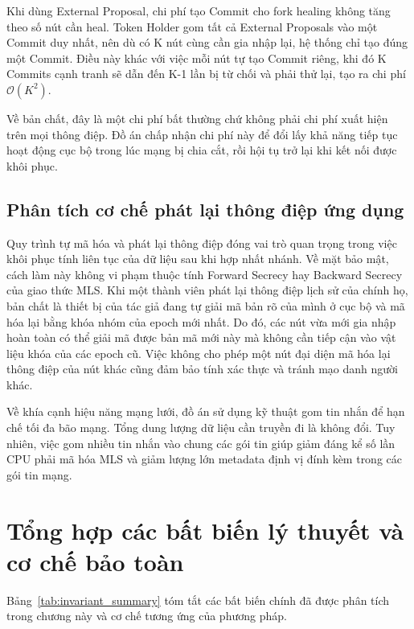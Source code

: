 \documentclass[../DoAn.tex]{subfiles}
\begin{document}
Khi dùng External Proposal, chi phí tạo Commit cho fork healing không tăng theo số nút cần heal. Token Holder gom tất cả External Proposals vào một Commit duy nhất, nên dù có K nút cùng cần gia nhập lại, hệ thống chỉ tạo đúng một Commit. Điều này khác với việc mỗi nút tự tạo Commit riêng, khi đó K Commits cạnh tranh sẽ dẫn đến K-1 lần bị từ chối và phải thử lại, tạo ra chi phí $\mathcal{O}(K^2)$.

Về bản chất, đây là một chi phí bất thường chứ không phải chi phí xuất hiện trên mọi thông điệp. Đồ án chấp nhận chi phí này để đổi lấy khả năng tiếp tục hoạt động cục bộ trong lúc mạng bị chia cắt, rồi hội tụ trở lại khi kết nối được khôi phục.

\subsection{Phân tích cơ chế phát lại thông điệp ứng dụng}

Quy trình tự mã hóa và phát lại thông điệp đóng vai trò quan trọng trong việc khôi phục tính liên tục của dữ liệu sau khi hợp nhất nhánh. Về mặt bảo mật, cách làm này không vi phạm thuộc tính Forward Secrecy hay Backward Secrecy của giao thức MLS. Khi một thành viên phát lại thông điệp lịch sử của chính họ, bản chất là thiết bị của tác giả đang tự giải mã bản rõ của mình ở cục bộ và mã hóa lại bằng khóa nhóm của epoch mới nhất. Do đó, các nút vừa mới gia nhập hoàn toàn có thể giải mã được bản mã mới này mà không cần tiếp cận vào vật liệu khóa của các epoch cũ. Việc không cho phép một nút đại diện mã hóa lại thông điệp của nút khác cũng đảm bảo tính xác thực và tránh mạo danh người khác.

Về khía cạnh hiệu năng mạng lưới, đồ án sử dụng kỹ thuật gom tin nhắn để hạn chế tối đa bão mạng. Tổng dung lượng dữ liệu cần truyền đi là không đổi. Tuy nhiên, việc gom nhiều tin nhắn vào chung các gói tin giúp giảm đáng kể số lần CPU phải mã hóa MLS và giảm lượng lớn metadata định vị đính kèm trong các gói tin mạng.

\section{Tổng hợp các bất biến lý thuyết và cơ chế bảo toàn}
\label{sec:tong_hop_bat_bien}

Bảng~\ref{tab:invariant_summary} tóm tắt các bất biến chính đã được phân tích trong chương này và cơ chế tương ứng của phương pháp.
\end{document}
